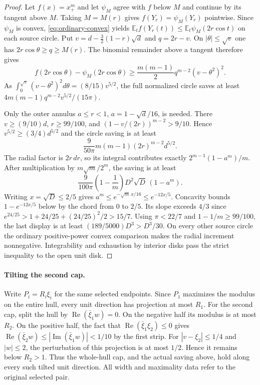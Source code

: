 \documentclass[11pt]{article}
\newcommand{\E}{\mathbb E}
\begin{document}
\begin{proof}
		Let $f(x)=x_+^m$ and let $\psi_M$ agree with $f$ below $M$ and
		continue by its tangent above $M$. Taking $M=M(r)$ gives
		$f(Y_r)=\psi_M(Y_r)$ pointwise. Since $\psi_M$ is convex,
		\eqref{eq:ordinary-convex} yields
		$\E_t f(Y_r(t))\leq\E_t\psi_M(2r\cos t)$ on each source circle.
		Put $v=d-\tfrac32(1-r)\sqrt d$ and $q=2r-v$.  On
		$|\theta|\leq\sqrt v$ one has $2r\cos\theta\geq q\geq M(r)$.
		The binomial remainder above a tangent therefore gives
		\[
		f(2r\cos\theta)-\psi_M(2r\cos\theta)
		\geq\frac{m(m-1)}2q^{m-2}(v-\theta^2)^2.
		\]
		As $\int_0^{\sqrt v}(v-\theta^2)^2d\theta
		=(8/15)v^{5/2}$, the full normalized circle saves at least
		$4m(m-1)q^{m-2}v^{5/2}/(15\pi)$.
		
		Only the outer annulus $a\leq r<1$, $a=1-\sqrt d/16$, is needed.
		There $v\geq(9/10)d$, $r\geq99/100$, and
		$(1-v/(2r))^{m-2}>9/10$.  Hence
		$v^{5/2}\geq(3/4)d^{5/2}$ and the circle saving is at least
		\[
		\frac9{50\pi}m(m-1)(2r)^{m-2}d^{5/2}.
		\]
		The radial factor is $2r\,dr$, so its integral contributes exactly
		$2^{m-1}(1-a^m)/m$.  After multiplication by $m\sqrt m/2^m$,
		the saving is at least
		\[
		\frac9{100\pi}\left(1-\frac1m\right)
		D^2\sqrt D\,(1-a^m).
		\]
		Writing $x=\sqrt D\leq2/5$ gives $a^m\leq
		e^{-\sqrt m\,x/16}\leq e^{-12x/5}$. Concavity bounds
		$1-e^{-12x/5}$ below by the chord from $0$ to $2/5$.
		Its slope exceeds $4/3$ since
		$e^{24/25}>1+24/25+(24/25)^2/2>15/7$.
		Using $\pi<22/7$ and $1-1/m\geq99/100$, the last display is
		at least $(189/5000)D^3>D^3/30$.  On every other source circle
		the ordinary positive-power convex comparison makes the radial
		increment nonnegative.  Integrability and exhaustion by interior
		disks pass the strict inequality to the open unit disk.
	\end{proof}
	
	\paragraph{Tilting the second cap.}
	Write $P_i=R_i\xi_i$ for the same selected endpoints.  Since $P_1$
	maximizes the modulus on the entire hull, every unit direction has
	projection at most $R_1$.  For the second cap, split the hull by
	$\operatorname{Re}(\bar\xi_1w)=0$.  On the negative half its
	modulus is at most $R_2$.  On the positive half, the fact that
	$\operatorname{Re}(\bar\xi_1\xi_2)\leq0$ gives
	$\operatorname{Re}(\bar\xi_2w)\leq
	|\operatorname{Im}(\bar\xi_1w)|<1/10$ by the first strip.
	For $|v-\xi_2|\leq1/4$ and $|w|\leq2$, the perturbation of this
	projection is at most $1/2$.  Hence it remains below $R_2>1$.
	Thus the whole-hull cap, and the actual saving above, hold along
	every such tilted unit direction.  All width and maximality data
	refer to the original selected pair.
	
\end{document}

